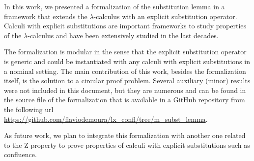  In this work, we presented a formalization of the substitution lemma in a framework that extends the $\lambda$-calculus with an explicit substitution operator. Calculi with explicit substitutions are important frameworks to study properties of the $\lambda$-calculus and have been extensively studied in the last decades\cite{abadiExplicitSubstitutions1991,accattoliAbstractFactorizationTheorem2012,ayala-rinconComparingCalculiExplicit2002,ayala-rinconComparingImplementingCalculi2005,bonelliPerpetualityNamedLambda2001,fujitaChurchRosserTheoremCompositional2016}. 


The formalization is modular in the sense that the explicit substitution operator is generic and could be instantiated with any calculi with  explicit substitutions in a nominal setting. The main contribution of this work, besides the formalization itself, is the solution to a circular proof problem. Several auxiliary (minor) results were not included in this document, but they are numerous and can be found in the source file of the formalization that is available in a GitHub repository from the following url \url{https://github.com/flaviodemoura/lx_confl/tree/m_subst_lemma}.


As future work, we plan to integrate this formalization with another one related to the Z property \cite{fmm2021} to prove properties of calculi with explicit substitutions such as confluence\cite{nakazawaCompositionalConfluenceProofs2016,nakazawaCallbyvalue2017,kesnerPerpetualityFullSafe2008}. \begin{coqdoccode}
\end{coqdoccode}

